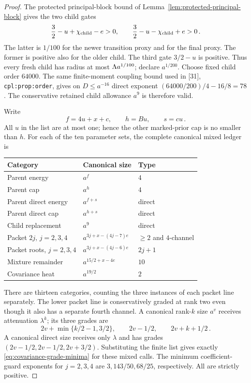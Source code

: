 \documentclass[11pt]{article}
\numberwithin{equation}{section}
\theoremstyle{remark}\newtheorem{remark}[theorem]{Remark}
\newcommand{\src}[1]{\texttt{\nolinkurl{#1}}}
\begin{document}
\begin{proof}
The protected principal-block bound of
Lemma~\ref{lem:protected-principal-block} gives the two child gates
\[
 \frac32-u+\chi_{\rm child}-e>0,\qquad
 \frac32-u-\chi_{\rm child}+e>0\,.
\]
The latter is $1/100$ for the newer transition proxy and for the
final proxy. The former is positive also for the older child.
The third gate $3/2-u$ is positive. Thus every fresh child has
radius at most $\Lambda a^{1/100}$; declare $a^{1/200}$.
Choose fixed child order $64000$. The same finite-moment coupling
bound used in [31], \src{cpl:prop:order}, gives on $D\le a^{-16}$
direct exponent $(64000/200)/4-16/8=78$.
The conservative retained child allowance $a^9$ is therefore valid.

Write
\[
 f=4u+x+c,\qquad h=Bu,\qquad s=cu\,.
\]
All $u$ in the list are at most one; hence the other marked-prior
cap is no smaller than $h$. For each of the ten parameter sets,
the complete canonical mixed ledger is
\begin{center}\small
\begin{tabular}{lll}
\toprule
Category&Canonical size&Type\\
\midrule
Parent energy&$a^f$&$4$\\
Parent cap&$a^h$&$4$\\
Parent direct energy&$a^{f+s}$&direct\\
Parent direct cap&$a^{h+s}$&direct\\
Child replacement&$a^9$&direct\\
Packet $2j$, $j=2,3,4$&$a^{3j+x-(4j-7)e}$&$\ge2$ and $4$-channel\\
Packet roots, $j=2,3,4$&$a^{3j+x-(4j-6)e}$&$2j+1$\\
Mixture remainder&$a^{15/2+x-4e}$&$10$\\
Covariance heat&$a^{19/2}$&$2$\\
\bottomrule
\end{tabular}
\end{center}
There are thirteen categories, counting the three instances of each
packet line separately. The lower packet line is conservatively
graded at rank two even though it also has a separate fourth channel.
A canonical rank-$k$ size $a^v$ receives attenuation $\lambda^k$;
its three grades are
\[
 2v+\min\{k/2-1,3/2\},\qquad 2v-1/2,\qquad 2v+k+1/2\,.
\]
A canonical direct size receives only $\lambda$ and has grades
$(2v-1/2,2v-1/2,2v+3/2)$.
Substituting the finite list gives exactly
\eqref{eq:covariance-grade-minima} for these mixed calls.
The minimum coefficient-guard exponents for $j=2,3,4$ are
$3,143/50,68/25$, respectively. All are strictly positive.


\end{proof}
\end{document}
